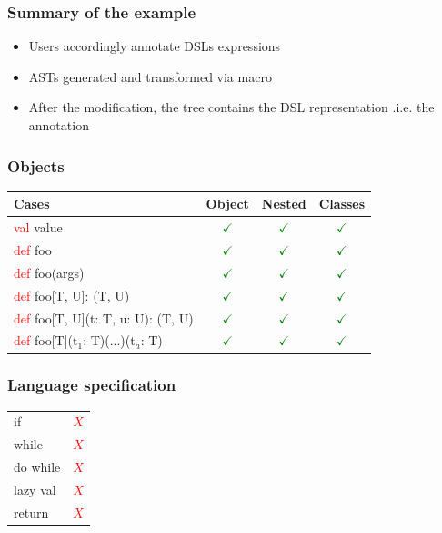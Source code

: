 \documentclass{beamer}
\newcommand{\TCR}{\textcolor{red}}
\newcommand{\TCG}{\textcolor{green}}
\newcommand{\TCAG}{\textcolor{applegreen}}
\begin{document}

\begin{frame}
\frametitle{Summary of the example}

\begin{itemize}
\item Users accordingly annotate DSLs expressions
\item ASTs generated and transformed via macro
\item After the modification, the tree contains the DSL representation .i.e. the annotation
\end{itemize}

\end{frame}


\begin{frame}
\frametitle{Objects}
\begin{table}
\begin{tabular}{lccc}
\toprule
Cases & Object & Nested & Classes\\
\midrule
\TCR{val} \TCAG{value} & \TCG{$\checkmark$} & \TCG{$\checkmark$} & \TCG{$\checkmark$} \\
\TCR{def} \TCAG{foo} & \TCG{$\checkmark$} & \TCG{$\checkmark$} & \TCG{$\checkmark$} \\
\TCR{def} \TCAG{foo}(args) & \TCG{$\checkmark$} & \TCG{$\checkmark$} & \TCG{$\checkmark$} \\
\TCR{def} \TCAG{foo}[T, U]: (T, U) & \TCG{$\checkmark$} & \TCG{$\checkmark$} & \TCG{$\checkmark$} \\
\TCR{def} \TCAG{foo}[T, U](t: T, u: U): (T, U) & \TCG{$\checkmark$} & \TCG{$\checkmark$} & \TCG{$\checkmark$} \\
\TCR{def} \TCAG{foo}[T](t$_1$: T)(...)(t$_a$: T) & \TCG{$\checkmark$} & \TCG{$\checkmark$} & \TCG{$\checkmark$} \\
\bottomrule
\end{tabular}
\end{table}
\end{frame}


\begin{frame}
\frametitle{Language specification}

\begin{table}
\begin{tabular}{lc}
\toprule
\midrule
if & \TCR{$X$} \\
while & \TCR{$X$} \\
do while & \TCR{$X$} \\
lazy val & \TCR{$X$} \\
return & \TCR{$X$} \\
\bottomrule
\end{tabular}
\end{table}
\end{frame}
\end{document}
